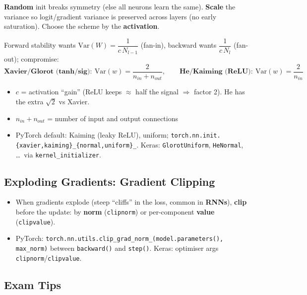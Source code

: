 \documentclass[10pt,a4paper]{article}
\begin{document}
	\begin{importantbox}
		\textbf{Random} init breaks symmetry (else all neurons learn the same). \textbf{Scale} the variance so logit/gradient variance is preserved across layers (no early saturation). Choose the scheme by the \textbf{activation}.
	\end{importantbox}

	\begin{formulabox}
		Forward stability wants $\mathrm{Var}(W)=\dfrac{1}{c\,N_{l-1}}$ (fan-in), backward wants $\dfrac{1}{c\,N_l}$ (fan-out); compromise:
		\[
		\textbf{Xavier/Glorot (tanh/sig)}:\ \mathrm{Var}(w)=\frac{2}{n_{in}+n_{out}}, \qquad
		\textbf{He/Kaiming (ReLU)}:\ \mathrm{Var}(w)=\frac{2}{n_{in}}
		\]
	\end{formulabox}
	\begin{itemize}[leftmargin=*]
		\item $c$ = activation ``gain'' (ReLU keeps $\approx$ half the signal $\Rightarrow$ factor 2). He has the extra $\sqrt2$ vs Xavier.
		\item $n_{in}+n_{out}$ = number of input and output connections
		\item PyTorch default: Kaiming (leaky ReLU), uniform; \texttt{torch.nn.init.\{xavier,kaiming\}\_\{normal,uniform\}\_}. Keras: \texttt{GlorotUniform}, \texttt{HeNormal}, \dots\ via \texttt{kernel\_initializer}.
	\end{itemize}

	\subsection{Exploding Gradients: Gradient Clipping}

	\begin{itemize}[leftmargin=*]
		\item When gradients explode (steep ``cliffs'' in the loss, common in \textbf{RNNs}), \textbf{clip} before the update: by \textbf{norm} (\texttt{clipnorm}) or per-component \textbf{value} (\texttt{clipvalue}).
		\item PyTorch: \texttt{torch.nn.utils.clip\_grad\_norm\_(model.parameters(), max\_norm)} between \texttt{backward()} and \texttt{step()}. Keras: optimiser args \texttt{clipnorm}/\texttt{clipvalue}.
	\end{itemize}

	\subsection{Exam Tips}
\end{document}

